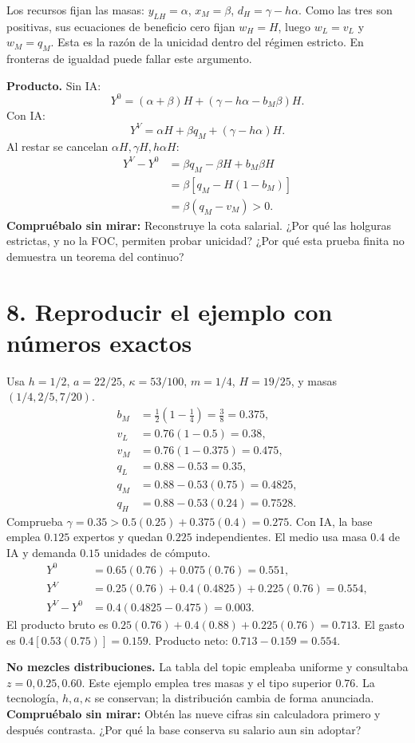 \documentclass[11pt]{article}
\newcommand{\pregunta}[1]{\medskip\textbf{Compruébalo sin mirar:} #1\par}
\begin{document}
Los recursos fijan las masas: $y_{LH}=\alpha$, $x_M=\beta$, $d_H=\gamma-h\alpha$. Como las tres son positivas, sus ecuaciones de beneficio cero fijan $w_H=H$, luego $w_L=v_L$ y $w_M=q_M$. Esta es la razón de la unicidad dentro del régimen estricto. En fronteras de igualdad puede fallar este argumento.

\textbf{Producto.} Sin IA:
\[
Y^0=(\alpha+\beta)H+(\gamma-h\alpha-b_M\beta)H.
\]
Con IA:
\[
Y^V=\alpha H+\beta q_M+(\gamma-h\alpha)H.
\]
Al restar se cancelan $\alpha H,\gamma H,h\alpha H$:
\begin{align*}
Y^V-Y^0&=\beta q_M-\beta H+b_M\beta H\\
&=\beta[q_M-H(1-b_M)]\\
&=\beta(q_M-v_M)>0.
\end{align*}
\pregunta{Reconstruye la cota salarial. ¿Por qué las holguras estrictas, y no la FOC, permiten probar unicidad? ¿Por qué esta prueba finita no demuestra un teorema del continuo?}
\newpage
\section*{8. Reproducir el ejemplo con números exactos}
Usa $h=1/2$, $a=22/25$, $\kappa=53/100$, $m=1/4$, $H=19/25$, y masas $(1/4,2/5,7/20)$.
\begin{align*}
b_M&=\tfrac12(1-\tfrac14)=\tfrac38=0.375,\\
v_L&=0.76(1-0.5)=0.38,\\
v_M&=0.76(1-0.375)=0.475,\\
q_L&=0.88-0.53=0.35,\\
q_M&=0.88-0.53(0.75)=0.4825,\\
q_H&=0.88-0.53(0.24)=0.7528.
\end{align*}
Comprueba $\gamma=0.35>0.5(0.25)+0.375(0.4)=0.275$. Con IA, la base emplea $0.125$ expertos y quedan $0.225$ independientes. El medio usa masa $0.4$ de IA y demanda $0.15$ unidades de cómputo.
\begin{align*}
Y^0&=0.65(0.76)+0.075(0.76)=0.551,\\
Y^V&=0.25(0.76)+0.4(0.4825)+0.225(0.76)=0.554,\\
Y^V-Y^0&=0.4(0.4825-0.475)=0.003.
\end{align*}
El producto bruto es $0.25(0.76)+0.4(0.88)+0.225(0.76)=0.713$. El gasto es $0.4[0.53(0.75)]=0.159$. Producto neto: $0.713-0.159=0.554$.

\textbf{No mezcles distribuciones.} La tabla del topic empleaba uniforme y consultaba $z=0,0.25,0.60$. Este ejemplo emplea tres masas y el tipo superior $0.76$. La tecnología, $h,a,\kappa$ se conservan; la distribución cambia de forma anunciada.
\pregunta{Obtén las nueve cifras sin calculadora primero y después contrasta. ¿Por qué la base conserva su salario aun sin adoptar?}
\newpage
\end{document}
